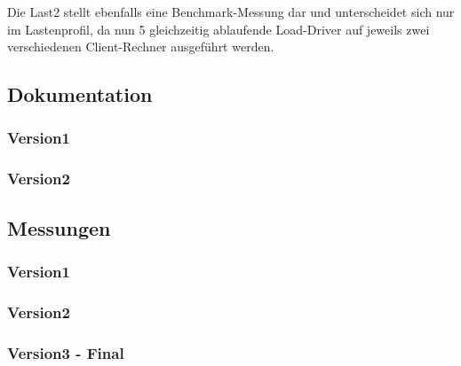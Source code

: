 Die Last2 stellt ebenfalls eine Benchmark-Messung dar und unterscheidet sich nur im Lastenprofil, da nun 5 gleichzeitig ablaufende Load-Driver auf jeweils zwei verschiedenen Client-Rechner ausgeführt werden.
\subsection{Dokumentation}\label{subsec:dokumentation-last2}
\subsubsection{Version1}
\subsubsection{Version2}

\subsection{Messungen}\label{subsec:messungen-last2}
\subsubsection{Version1}
\subsubsection{Version2}
\subsubsection{Version3 - Final}